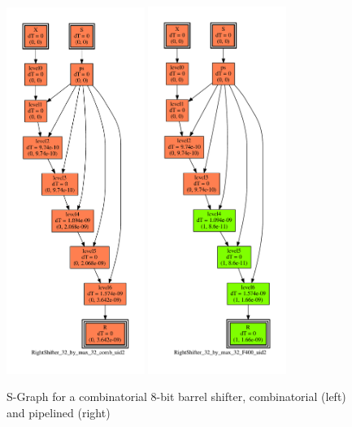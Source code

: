 \documentclass{article}
\begin{document}
  \begin{figure}
    \includegraphics[width=0.4\textwidth]{Fig/depgraphShifterNoPipe}
    \hfill
    \includegraphics[width=0.4\textwidth]{Fig/depgraphShifterPipelined}
		\centering
		\caption{S-Graph for a combinatorial 8-bit barrel shifter, combinatorial (left) and pipelined (right)}
		\label{fig:depgraphShifter}
	\end{figure}    
\end{document}
